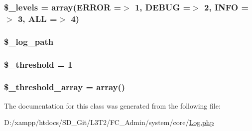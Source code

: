 \subsubsection[{\$\+\_\+levels}]{\setlength{\rightskip}{0pt plus 5cm}\$\+\_\+levels = array(\textquotesingle{}E\+R\+R\+O\+R\textquotesingle{} =$>$ 1, \textquotesingle{}D\+E\+B\+U\+G\textquotesingle{} =$>$ 2, \textquotesingle{}I\+N\+F\+O\textquotesingle{} =$>$ 3, \textquotesingle{}A\+L\+L\textquotesingle{} =$>$ 4)\hspace{0.3cm}{\ttfamily [protected]}}\label{class_c_i___log_aeb1c4747136537731b6cfed6f1e64941}
\hypertarget{class_c_i___log_a3eaf9e92941ee6be33bc972ab76b4caf}{}
\subsubsection[{\$\+\_\+log\+\_\+path}]{\setlength{\rightskip}{0pt plus 5cm}\$\+\_\+log\+\_\+path\hspace{0.3cm}{\ttfamily [protected]}}\label{class_c_i___log_a3eaf9e92941ee6be33bc972ab76b4caf}
\hypertarget{class_c_i___log_a0fc9914bdaf300fa9a1745201204e73f}{}
\subsubsection[{\$\+\_\+threshold}]{\setlength{\rightskip}{0pt plus 5cm}\$\+\_\+threshold = 1\hspace{0.3cm}{\ttfamily [protected]}}\label{class_c_i___log_a0fc9914bdaf300fa9a1745201204e73f}
\hypertarget{class_c_i___log_a95562d965f341c55d2c997ed12b4b721}{}
\subsubsection[{\$\+\_\+threshold\+\_\+array}]{\setlength{\rightskip}{0pt plus 5cm}\$\+\_\+threshold\+\_\+array = array()\hspace{0.3cm}{\ttfamily [protected]}}\label{class_c_i___log_a95562d965f341c55d2c997ed12b4b721}


The documentation for this class was generated from the following file\+:\begin{DoxyCompactItemize}
\item 
D\+:/xampp/htdocs/\+S\+D\+\_\+\+Git/\+L3\+T2/\+F\+C\+\_\+\+Admin/system/core/\hyperlink{_log_8php}{Log.\+php}\end{DoxyCompactItemize}
